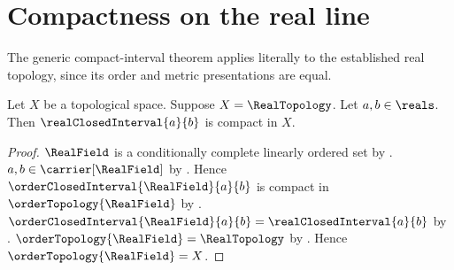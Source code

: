 \section{Compactness on the real line}




The generic compact-interval theorem applies literally to the established
real topology, since its order and metric presentations are equal.

\begin{theorem}\label{real_closed_interval_is_compact}
    Let $X$ be a topological space.
    Suppose $X=\RealTopology$.
    Let $a,b\in\reals$.
    Then $\realClosedInterval{a}{b}$ is compact in $X$.
\end{theorem}
\begin{proof}
    $\RealField$ is a conditionally complete linearly ordered set by
        .
    $a,b\in\carrier[\RealField]$ by
        .
    Hence $\orderClosedInterval{\RealField}{a}{b}$ is compact in
        $\orderTopology{\RealField}$ by
        .
    $\orderClosedInterval{\RealField}{a}{b}
        =\realClosedInterval{a}{b}$ by
        .
    $\orderTopology{\RealField}=\RealTopology$ by
        .
    Hence $\orderTopology{\RealField}=X$.
\end{proof}
